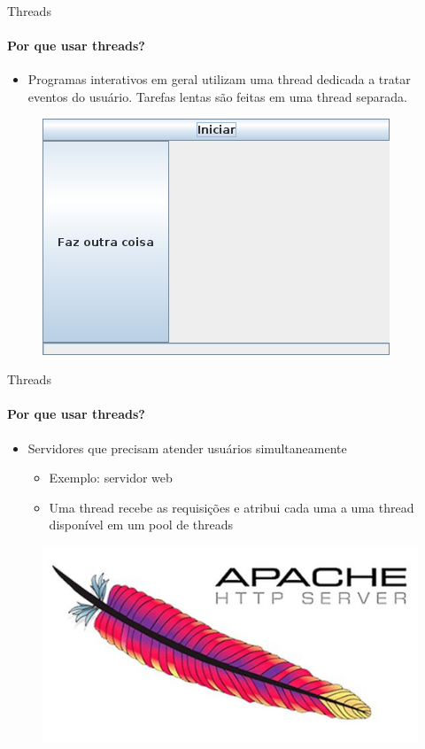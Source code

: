 \documentclass{beamer}
\begin{document}
\begin{frame}{Threads}
	\framesubtitle{Por que usar threads?}
	\begin{itemize}
		\item Programas interativos em geral utilizam uma thread dedicada a tratar eventos do usuário. Tarefas lentas são feitas em uma thread separada.
	\end{itemize}
	\begin{figure}
		\includegraphics[width=0.5\paperwidth]{resources/gui}
	\end{figure}
\end{frame}
\begin{frame}{Threads}
	\framesubtitle{Por que usar threads?}
	\begin{itemize}
		\item Servidores que precisam atender usuários simultaneamente
		\begin{itemize}
			\item Exemplo: servidor web
			\item Uma thread recebe as requisições e atribui cada uma a uma thread disponível em um \alert{pool} de threads
		\end{itemize}
	\end{itemize}
	\begin{figure}
		\includegraphics[width=0.4\paperwidth]{resources/apache}
	\end{figure}
\end{frame}
\end{document}
